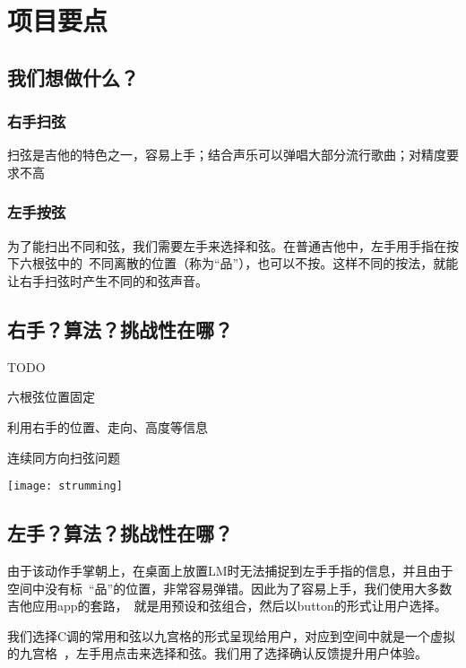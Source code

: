 \chapter{项目要点}


    \section{我们想做什么？}
        \subsection{右手扫弦}
        扫弦是吉他的特色之一，容易上手；结合声乐可以弹唱大部分流行歌曲；对精度要求不高

        \subsection{左手按弦}
        为了能扫出不同和弦，我们需要左手来选择和弦。在普通吉他中，左手用手指在按下六根弦中的\
        不同离散的位置（称为“品”），也可以不按。这样不同的按法，就能让右手扫弦时产生不同的和弦声音。


    \section{右手？算法？挑战性在哪？}
        TODO

        六根弦位置固定

        利用右手的位置、走向、高度等信息

        连续同方向扫弦问题

        \texttt{[image: strumming]}

    \section{左手？算法？挑战性在哪？}
        由于该动作手掌朝上，在桌面上放置LM时无法捕捉到左手手指的信息，并且由于空间中没有标\
        “品”的位置，非常容易弹错。因此为了容易上手，我们使用大多数吉他应用app的套路，\
        就是用预设和弦组合，然后以button的形式让用户选择。

        我们选择C调的常用和弦以九宫格的形式呈现给用户，对应到空间中就是一个虚拟的九宫格\
        ，左手用点击来选择和弦。我们用了选择确认反馈提升用户体验。
